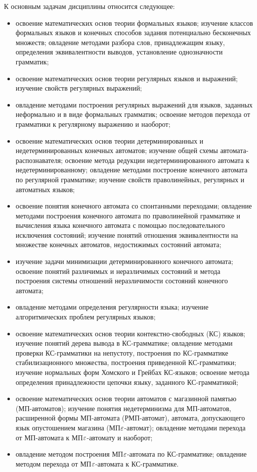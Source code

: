 К основным задачам дисциплины относится следующее: 
\begin{itemize}
\item освоение математических основ теории формальных языков; изучение классов формальных языков и конечных способов задания потенциально бесконечных множеств; овладение методами разбора слов, принадлежащим языку, определения эквивалентности выводов, установление однозначности грамматик;
\item освоение математических основ теории регулярных языков и выражений; изучение свойств регулярных выражений; \item овладение методами построения регулярных выражений для языков, заданных неформально и в виде формальных грамматик; освоение методов перехода от грамматики к регулярному выражению и наоборот;
\item освоение математических основ теории детерминированных и недетерминированных конечных автоматов; изучение общей схемы автомата-распознавателя; освоение метода редукции недетерминированного автомата к недетерминированному; овладение методами построение конечного автомата по регулярной грамматике; изучение свойств праволинейных, регулярных и автоматных языков;
\item освоение понятия конечного автомата со спонтанными переходами; овладение методами построения конечного автомата по праволинейной грамматике и вычисления языка конечного автомата с помощью последовательного исключения состояний; изучение понятий отношения эквивалентности на множестве конечных автоматов, недостижимых состояний автомата;
\item изучение задачи минимизации детерминированного конечного автомата; освоение понятий различимых и неразличимых состояний и метода построения системы отношений неразличимости состояний конечного автомата; 
\item овладение методами определения регулярности языка; изучение алгоритмических проблем регулярных языков;
\item освоение математических основ теории контекстно-свободных (КС) языков; изучение понятий дерева вывода в КС-грамматике; овладение методами проверки КС-грамматики на непустоту, построения по КС-грамматике стабилизационного множества, построения приведенной КС-грамматики; изучение нормальных форм Хомского и Грейбах КС-языков; освоение метода определения принадлежности цепочки языку, заданного КС-грамматикой;
\item освоение математических основ теории автоматов с магазинной памятью (МП-автоматов); изучение понятия недетерминизма для МП-автоматов, расширенной формы МП-автомата (РМП-автомат), автомата, допускающего язык опустошением магазина (МП$\varepsilon$-автомат); овладение методами перехода от МП-автомата к МП$\varepsilon$-автомату и наоборот; 
\item овладение методом построения МП$\varepsilon$-автомата по КС-грамматике; овладение методом перехода от МП$\varepsilon$-автомата к КС-грамматике. 
\end{itemize}

